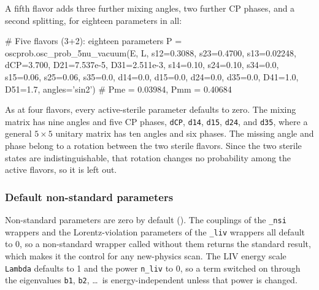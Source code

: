 A fifth flavor adds three further mixing angles, two further CP phases, and a second splitting, for eighteen parameters in all:
\begin{pysnip}
# Five flavors (3+2): eighteen parameters
P = oscprob.osc_prob_5nu_vacuum(E, L,
 s12=0.3088, s23=0.4700, s13=0.02248,
 dCP=3.700, D21=7.537e-5, D31=2.511e-3,
 s14=0.10, s24=0.10, s34=0.0,
 s15=0.06, s25=0.06, s35=0.0,
 d14=0.0, d15=0.0, d24=0.0, d35=0.0,
 D41=1.0, D51=1.7, angles='sin2')
# Pme = 0.03984, Pmm = 0.40684
\end{pysnip}
As at four flavors, every active-sterile parameter defaults to zero. The mixing matrix has nine angles and five CP phases, {\tt dCP}, {\tt d14}, {\tt d15}, {\tt d24}, and {\tt d35}, where a general $5 \times 5$ unitary matrix has ten angles and six phases. The missing angle and phase belong to a rotation between the two sterile flavors. Since the two sterile states are indistinguishable, that rotation changes no probability among the active flavors, so it is left out.


\subsubsection{Default non-standard parameters}

Non-standard parameters are zero by default (). The couplings of the {\tt \_nsi} wrappers and the Lorentz-violation parameters of the {\tt \_liv} wrappers all default to 0, so a non-standard wrapper called without them returns the standard result, which makes it the control for any new-physics scan. The LIV energy scale {\tt Lambda} defaults to 1 and the power {\tt n\_liv} to 0, so a term switched on through the eigenvalues {\tt b1}, {\tt b2}, \ldots\ is energy-independent unless that power is changed.
